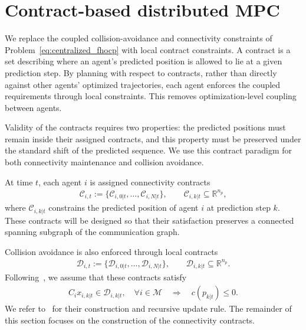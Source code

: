 \documentclass[letterpaper, 10 pt, conference]{ieeeconf}  %
\begin{document}
\section{Contract-based distributed MPC} \label{sec:contract_dmpc}

We replace the coupled collision-avoidance and connectivity constraints of
Problem~\eqref{eq:centralized_fhocp} with local contract constraints. A contract
is a set describing where an agent's predicted position is allowed to lie
at a given prediction step. By planning with respect to contracts, rather than
directly against other agents' optimized trajectories, each agent enforces the
coupled requirements through local constraints. This removes
optimization-level coupling between agents.

Validity of the contracts requires two properties: the predicted positions must
remain inside their assigned contracts, and this property must be preserved
under the standard shift of the predicted sequence. We use this contract paradigm for
both connectivity maintenance and collision avoidance.

At time $t$, each agent $i$ is assigned connectivity contracts
\begin{align}
	\mathcal{C}_{i,t}
	:=
	\{\mathcal{C}_{i,0|t},\ldots,\mathcal{C}_{i,N|t}\},
	\qquad
	\mathcal{C}_{i,k|t}\subseteq\mathbb{R}^{n_p},
\end{align}
where $\mathcal{C}_{i,k|t}$ constrains the predicted position of agent $i$ at
prediction step $k$. These contracts will be designed so that their satisfaction
preserves a connected spanning subgraph of the communication graph.

Collision avoidance is also enforced through local contracts
\begin{align}
	\mathcal{D}_{i,t}
	:=
	\{\mathcal{D}_{i,0|t},\ldots,\mathcal{D}_{i,N|t}\},
	\qquad
	\mathcal{D}_{i,k|t}\subseteq\mathbb{R}^{n_p}.
\end{align}
Following~\cite{bodmer2026anytime}, we assume that these contracts satisfy
\begin{align}
	C_i x_{i,k|t}\in \mathcal{D}_{i,k|t},
	\quad \forall i\in\mathcal{M}
	\quad\Longrightarrow\quad
	c(p_{k|t})\leq 0.
	\label{eq:collision_contract_implication}
\end{align}
We refer to~\cite{bodmer2026anytime} for their construction and recursive update
rule. The remainder of this section focuses on the construction of the
connectivity contracts.
\end{document}
